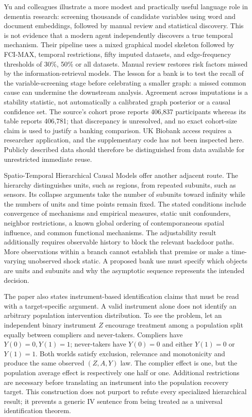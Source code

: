 Yu and colleagues illustrate a more modest and practically useful language
role in dementia research: screening thousands of candidate variables using
word and document embeddings, followed by manual review and statistical
discovery. This is not evidence that a modern agent independently discovers
a true temporal mechanism. Their pipeline uses a mixed graphical model
skeleton followed by FCI-MAX, temporal restrictions, fifty imputed datasets,
and edge-frequency thresholds of 30\%, 50\% or all datasets. Manual review
restores risk factors missed by the information-retrieval models. The lesson
for a bank is to test the recall of the variable-screening stage before
celebrating a smaller graph: a missed common cause can undermine the
downstream analysis. Agreement across imputations is a stability statistic,
not automatically a calibrated graph posterior or a causal confidence set.
The source's cohort prose reports 406,837 participants whereas its table
reports 406,781; that discrepancy is unresolved, and no exact cohort-size
claim is used to justify a banking comparison. UK Biobank access requires a
researcher application, and the supplementary code has not been inspected
here. Publicly described data should therefore be distinguished from data
available for unrestricted immediate reuse.
\citep{exec15_latent_yu}

Spatio-Temporal Hierarchical Causal Models offer another adjacent route.
The hierarchy distinguishes units, such as regions, from repeated subunits,
such as sensors. Its collapse arguments take the number of subunits toward
infinity while the numbers of units and time points remain fixed. The
stated conditions include convergence of mechanisms and empirical measures,
static unit confounders, neighbor restrictions, a known global ordering of
contemporaneous spatial influence, and common functional mechanisms. The
adjustability result additionally requires observable history to block the
relevant backdoor paths. More observations within a branch cannot establish
that premise or make a time-varying unobserved shock static. A proposed bank
use must specify which objects are units and subunits and why the asymptotic
sequence represents the intended decision.
\citep{exec15_latent_sthcm}

The paper also states instrument-based identification claims that must be
read with a target-specific argument. A valid instrument alone does not
identify an arbitrary population intervention distribution. To see the
problem, let an independent binary instrument $Z$ encourage treatment among
a population split equally between compliers and never-takers. Compliers
have $Y(0)=0,Y(1)=1$; never-takers have $Y(0)=0$ and either $Y(1)=0$ or
$Y(1)=1$. Both worlds satisfy exclusion, relevance and monotonicity and
produce the same observed $(Z,A,Y)$ law. The complier effect is one, but
the population average effect is respectively one half or one. Additional
restrictions are necessary before translating an instrument into the
population recovery target. This construction does not purport to refute
every specialized hierarchical result; it prevents a generic IV sentence
from being treated as a universal identification theorem.
\citep{exec15_latent_sthcm,exec15_latent_exact}

